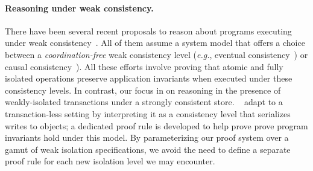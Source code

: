 \paragraph{Reasoning under weak consistency.} There have been several
recent proposals to reason about programs executing under weak
consistency~\cite{bailisvldb, alvarocalm, gotsmanpopl16,redblueatc,
redblueosdi, ecinec}. All of them assume a system model that offers a
choice between a \emph{coordination-free} weak consistency level
(\emph{e.g.}, eventual consistency~\cite{redblueosdi, redblueatc,
ecinec, alvarocalm, bailisvldb}) or causal
consistency~\cite{lbc16,gotsmanpopl16}). All these efforts involve
proving that atomic and fully isolated operations preserve application
invariants when executed under these consistency levels.  In contrast,
our focus in on reasoning in the presence of weakly-isolated
transactions under a strongly consistent store.  ~\cite{gotsmanpopl16}
adapt  to a transaction-less setting
by interpreting it as a consistency level that serializes writes to
objects; a dedicated proof rule is developed to help prove prove
program invariants hold under this model. By parameterizing our proof
system over a gamut of weak isolation specifications, we avoid the
need to define a separate proof rule for each new isolation level we
may encounter.
